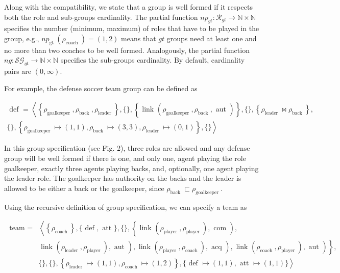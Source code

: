 \documentclass[10pt]{article}
\begin{document}
Along with the compatibility, we state that a group is well formed if it respects both the role and sub-groups cardinality. The partial function $n p_{g t}: \mathcal{R}_{g t} \rightarrow \mathbb{N} \times \mathbb{N}$ specifies the number (minimum, maximum) of roles that have to be played in the group, e.g., $n p_{\text {gt }}\left(\rho_{\text {coach }}\right)=(1,2)$ means that $g t$ groups need at least one and no more than two coaches to be well formed. Analogously, the partial function $n g: \mathcal{S G}_{g t} \rightarrow \mathbb{N} \times \mathbb{N}$ specifies the sub-groups cardinality. By default, cardinality pairs are $(0, \infty)$.

For example, the defense soccer team group can be defined as

$$
\begin{gathered}
\text { def }=\left\langle\left\{\rho_{\text {goalkeeper }}, \rho_{\text {back }}, \rho_{\text {leader }}\right\},\{\},\left\{\text { link }\left(\rho_{\text {goalkeeper }}, \rho_{\text {back }}, \text { aut }\right)\right\},\{\},\left\{\rho_{\text {leader }} \bowtie \rho_{\text {back }}\right\},\right. \\
\left.\{\},\left\{\rho_{\text {goalkeeper }} \mapsto(1,1), \rho_{\text {back }} \mapsto(3,3), \rho_{\text {leader }} \mapsto(0,1)\right\},\{\}\right\rangle
\end{gathered}
$$

In this group specification (see Fig. 2), three roles are allowed and any defense group will be well formed if there is one, and only one, agent playing the role goalkeeper, exactly three agents playing backs, and, optionally, one agent playing the leader role. The goalkeeper has authority on the backs and the leader is allowed to be either a back or the goalkeeper, since $\rho_{\text {back }} \sqsubset \rho_{\text {goalkeeper }}$.

Using the recursive definition of group specification, we can specify a team as

$$
\begin{aligned}
\text { team }= & \left\langle\left\{\rho_{\text {coach }}\right\},\{\text { def }, \text { att }\},\{\},\left\{\text { link }\left(\rho_{\text {player }}, \rho_{\text {player }}\right), \text { com }\right),\right. \\
& \text { link } \left.\left.\left.\left.\left(\rho_{\text {leader }}, \rho_{\text {player }}\right), \text { aut }\right), \text { link }\left(\rho_{\text {player }}, \rho_{\text {coach }}\right), \text { acq }\right), \text { link }\left(\rho_{\text {coach }}, \rho_{\text {player }}\right), \text { aut }\right)\right\}, \\
& \left.\{\},\{\},\left\{\rho_{\text {leader }} \mapsto(1,1), \rho_{\text {coach }} \mapsto(1,2)\right\},\{\text { def } \mapsto(1,1), \text { att } \mapsto(1,1)\}\right\rangle
\end{aligned}
$$
\end{document}
